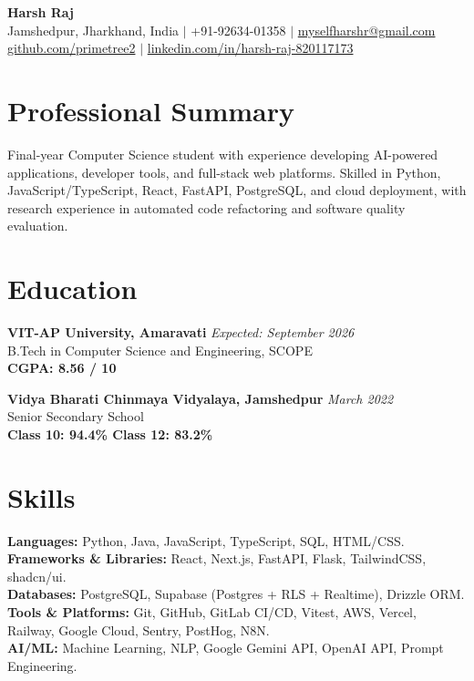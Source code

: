 \documentclass[11pt]{article}
\begin{document}
\begin{center}
    {\LARGE \textbf{Harsh Raj}}\\[3pt]
    \small
    Jamshedpur, Jharkhand, India $\vert$ +91-92634-01358 $\vert$ \href{mailto:myselfharshr@gmail.com}{myselfharshr@gmail.com} \\
    \href{https://github.com/primetree2}{github.com/primetree2} $\vert$ \href{http://www.linkedin.com/in/harsh-raj-820117173}{linkedin.com/in/harsh-raj-820117173}
\end{center}

\section*{Professional Summary}

Final-year Computer Science student with experience developing AI-powered applications, developer tools, and full-stack web platforms. Skilled in Python, JavaScript/TypeScript, React, FastAPI, PostgreSQL, and cloud deployment, with research experience in automated code refactoring and software quality evaluation.

\vspace{-2mm}
\section*{Education}

\noindent\textbf{VIT-AP University, Amaravati} \hfill \textit{Expected: September 2026}\\
B.Tech in Computer Science and Engineering, SCOPE \\
\textbf{CGPA: 8.56 / 10}

\vspace{0.8em}

\noindent\textbf{Vidya Bharati Chinmaya Vidyalaya, Jamshedpur} \hfill \textit{March 2022}\\
Senior Secondary School \\
\textbf{Class 10: 94.4\% \quad Class 12: 83.2\%}



\section*{Skills}
\textbf{Languages:} Python, Java, JavaScript, TypeScript, SQL, HTML/CSS.\\
\textbf{Frameworks \& Libraries:} React, Next.js, FastAPI, Flask, TailwindCSS, shadcn/ui.\\
\textbf{Databases:} PostgreSQL, Supabase (Postgres + RLS + Realtime), Drizzle ORM.\\
\textbf{Tools \& Platforms:} Git, GitHub, GitLab CI/CD, Vitest, AWS, Vercel, Railway, Google Cloud, Sentry, PostHog, N8N.\\
\textbf{AI/ML:} Machine Learning, NLP, Google Gemini API, OpenAI API, Prompt Engineering.\\
\end{document}
